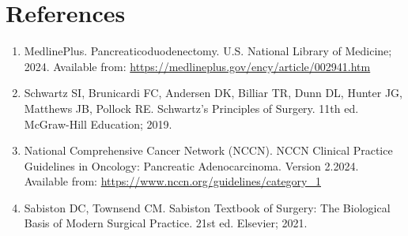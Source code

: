 \section*{References}
\begin{enumerate}
  \item MedlinePlus. Pancreaticoduodenectomy. U.S. National Library of Medicine; 2024. Available from: \url{https://medlineplus.gov/ency/article/002941.htm}
  
  \item Schwartz SI, Brunicardi FC, Andersen DK, Billiar TR, Dunn DL, Hunter JG, Matthews JB, Pollock RE. Schwartz's Principles of Surgery. 11th ed. McGraw-Hill Education; 2019.
  
  \item National Comprehensive Cancer Network (NCCN). NCCN Clinical Practice Guidelines in Oncology: Pancreatic Adenocarcinoma. Version 2.2024. Available from: \url{https://www.nccn.org/guidelines/category_1}
  
  \item Sabiston DC, Townsend CM. Sabiston Textbook of Surgery: The Biological Basis of Modern Surgical Practice. 21st ed. Elsevier; 2021.
\end{enumerate}

\clearpage
